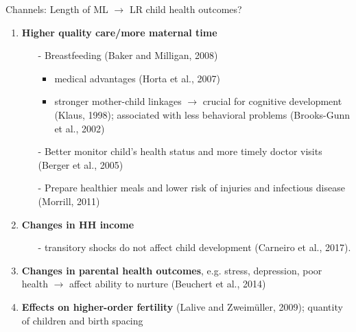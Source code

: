\documentclass[handout]{beamer} %
\begin{document}
\begin{frame}
\begin{block}{Channels: Length of ML $\rightarrow$ LR child health outcomes?}
\begin{enumerate}
\item \textbf{Higher quality care/more maternal time} 
\begin{itemize}
\item[-]Breastfeeding (Baker and Milligan, 2008)
\begin{itemize}
\item medical advantages (Horta et al., 2007)
\item stronger mother-child linkages $\rightarrow$ crucial for cognitive development (Klaus, 1998); associated with less behavioral problems (Brooks-Gunn et al., 2002)
\end{itemize}
\item[-]Better monitor child's health status and more timely doctor visits (Berger et al., 2005)

\item[-] Prepare healthier meals and lower risk of injuries and infectious disease (Morrill, 2011)\pause
\end{itemize}


\item \textbf{Changes in HH income}
\begin{itemize}
\item[-] transitory  shocks do not affect child development (Carneiro et al., 2017).
\end{itemize}\pause
\item \textbf{Changes in parental health outcomes}, e.g. stress, depression, poor health $\rightarrow$ affect ability to nurture (Beuchert et al., 2014)\pause
\item \textbf{Effects on higher-order fertility} (Lalive and Zweimüller, 2009); quantity of children and birth spacing
\end{enumerate}
\end{block}
\end{frame}
\end{document}
